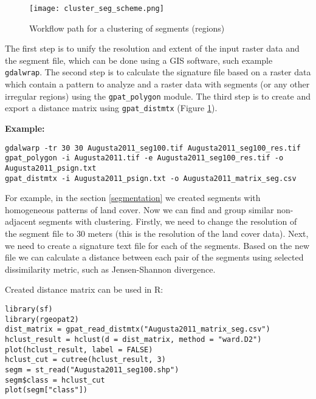 \begin{figure}[H]
	\centering
	\texttt{[image: cluster\_seg\_scheme.png]}
	\caption{Workflow path for a clustering of segments (regions)}
	\label{FIG:CLUSTER_SEGMENT}
\end{figure}

The first step is to unify the resolution and extent of the input raster data and the segment file, which can be done using a GIS software, such example {\tt gdalwrap}.
The second step is to calculate the signature file based on a raster data which contain a pattern to analyze and a raster data with segments (or any other irregular regions) using the {\tt gpat\_polygon} module.
The third step is to create and export a distance matrix using {\tt gpat\_distmtx} (Figure \ref{FIG:CLUSTER_SEGMENT}).

{\bf Example:}

\begin{minipage}{\linewidth}
\begin{lstlisting}
gdalwarp -tr 30 30 Augusta2011_seg100.tif Augusta2011_seg100_res.tif
gpat_polygon -i Augusta2011.tif -e Augusta2011_seg100_res.tif -o Augusta2011_psign.txt
gpat_distmtx -i Augusta2011_psign.txt -o Augusta2011_matrix_seg.csv
\end{lstlisting}
\end{minipage}

For example, in the section \ref{segmentation} we created segments with homogeneous patterns of land cover.
Now we can find and group similar non-adjacent segments with clustering.
Firstly, we need to change the resolution of the segment file to 30 meters (this is the resolution of the land cover data).
Next, we need to create a signature text file for each of the segments.
Based on the new file we can calculate a distance between each pair of the segments using selected dissimilarity metric, such as Jensen-Shannon divergence.

Created distance matrix can be used in R:

\begin{minipage}{\linewidth}
\begin{lstlisting}
library(sf)
library(rgeopat2)
dist_matrix = gpat_read_distmtx("Augusta2011_matrix_seg.csv")
hclust_result = hclust(d = dist_matrix, method = "ward.D2")
plot(hclust_result, label = FALSE)
hclust_cut = cutree(hclust_result, 3)
segm = st_read("Augusta2011_seg100.shp")
segm$class = hclust_cut
plot(segm["class"])
\end{lstlisting}
\end{minipage}

